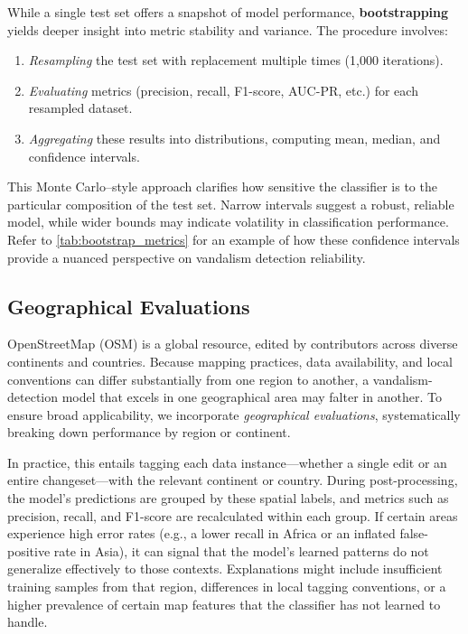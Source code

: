 \documentclass[
    13pt, %
    a4paper, %
    listof=totoc, %
    bibliography=totoc, %
    index=totoc, %
    headsepline
]{scrreprt}
\begin{document}
While a single test set offers a snapshot of model performance, \textbf{bootstrapping}~\cite{bootstrapping} yields deeper insight into metric stability and variance. The procedure involves:
\begin{enumerate}
    \item \emph{Resampling} the test set with replacement multiple times (1,000 iterations).
    \item \emph{Evaluating} metrics (precision, recall, F1-score, AUC-PR, etc.) for each resampled dataset.
    \item \emph{Aggregating} these results into distributions, computing mean, median, and confidence intervals.
\end{enumerate}
This Monte Carlo–style approach clarifies how sensitive the classifier is to the particular composition of the test set. Narrow intervals suggest a robust, reliable model, while wider bounds may indicate volatility in classification performance. Refer to \autoref{tab:bootstrap_metrics} for an example of how these confidence intervals provide a nuanced perspective on vandalism detection reliability.

\subsection{Geographical Evaluations}
\label{sec:geographical_evaluations}

OpenStreetMap (OSM) is a global resource, edited by contributors across diverse continents and countries. Because mapping practices, data availability, and local conventions can differ substantially from one region to another, a vandalism-detection model that excels in one geographical area may falter in another. To ensure broad applicability, we incorporate \emph{geographical evaluations}, systematically breaking down performance by region or continent.

In practice, this entails tagging each data instance—whether a single edit or an entire changeset—with the relevant continent or country. During post-processing, the model’s predictions are grouped by these spatial labels, and metrics such as precision, recall, and F1-score are recalculated within each group. If certain areas experience high error rates (e.g., a lower recall in Africa or an inflated false-positive rate in Asia), it can signal that the model’s learned patterns do not generalize effectively to those contexts. Explanations might include insufficient training samples from that region, differences in local tagging conventions, or a higher prevalence of certain map features that the classifier has not learned to handle. 
\end{document}
